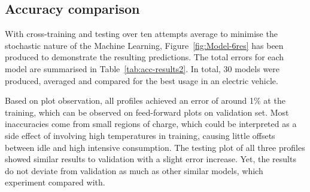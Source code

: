 \subsection{Accuracy comparison}
With cross-training and testing over ten attempts average to minimise the stochastic nature of the Machine Learning, Figure~\ref{fig:Model-6res} has been produced to demonstrate the resulting predictions.
The total errors for each model are summarised in Table~\ref{tab:acc-results2}.
In total, 30 models were produced, averaged and compared for the best usage in an electric vehicle.

%
%
Based on plot observation, all profiles achieved an error of around 1\% at the training, which can be observed on feed-forward plots on validation set.
Most inaccuracies come from small regions of charge, which could be interpreted as a side effect of involving high temperatures in training, causing little offsets between idle and high intensive consumption.
The testing plot of all three profiles showed similar results to validation with a slight error increase.
Yet, the results do not deviate from validation as much as other similar models,  which experiment compared with.


